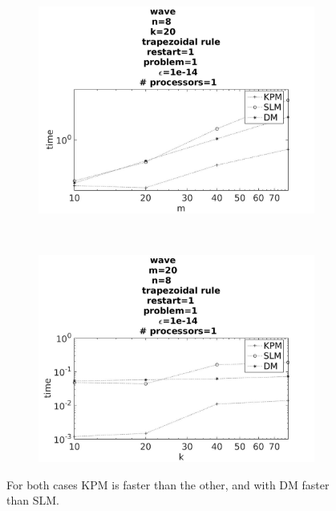 \begin{figure}[H]
        \centering
        \begin{subfigure}[b]{0.45\textwidth}
                \includegraphics[width=\textwidth]{../MATLAB/fig/resulttimem.jpg}
                \caption{  }
                \label{fig:resulttimem}
        \end{subfigure}
        ~
        \begin{subfigure}[b]{0.45\textwidth}
                \includegraphics[width=\textwidth]{../MATLAB/fig/resulttimek.jpg}
                \caption{  }
                \label{fig:resulttimek}
        \end{subfigure}
        \caption{ For both cases KPM is faster than the other, and with DM faster than SLM.  }
        \label{fig:resulttime}
\end{figure}



